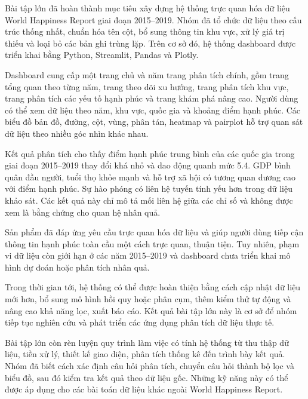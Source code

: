 
Bài tập lớn đã hoàn thành mục tiêu xây dựng hệ thống trực quan hóa dữ liệu World Happiness Report giai đoạn 2015--2019. Nhóm đã tổ chức dữ liệu theo cấu trúc thống nhất, chuẩn hóa tên cột, bổ sung thông tin khu vực, xử lý giá trị thiếu và loại bỏ các bản ghi trùng lặp. Trên cơ sở đó, hệ thống dashboard được triển khai bằng Python, Streamlit, Pandas và Plotly.

Dashboard cung cấp một trang chủ và năm trang phân tích chính, gồm trang tổng quan theo từng năm, trang theo dõi xu hướng, trang phân tích khu vực, trang phân tích các yếu tố hạnh phúc và trang khám phá nâng cao. Người dùng có thể xem dữ liệu theo năm, khu vực, quốc gia và khoảng điểm hạnh phúc. Các biểu đồ bản đồ, đường, cột, vùng, phân tán, heatmap và pairplot hỗ trợ quan sát dữ liệu theo nhiều góc nhìn khác nhau.

Kết quả phân tích cho thấy điểm hạnh phúc trung bình của các quốc gia trong giai đoạn 2015--2019 thay đổi khá nhỏ và dao động quanh mức 5.4. GDP bình quân đầu người, tuổi thọ khỏe mạnh và hỗ trợ xã hội có tương quan dương cao với điểm hạnh phúc. Sự hào phóng có liên hệ tuyến tính yếu hơn trong dữ liệu khảo sát. Các kết quả này chỉ mô tả mối liên hệ giữa các chỉ số và không được xem là bằng chứng cho quan hệ nhân quả.

Sản phẩm đã đáp ứng yêu cầu trực quan hóa dữ liệu và giúp người dùng tiếp cận thông tin hạnh phúc toàn cầu một cách trực quan, thuận tiện. Tuy nhiên, phạm vi dữ liệu còn giới hạn ở các năm 2015--2019 và dashboard chưa triển khai mô hình dự đoán hoặc phân tích nhân quả.

Trong thời gian tới, hệ thống có thể được hoàn thiện bằng cách cập nhật dữ liệu mới hơn, bổ sung mô hình hồi quy hoặc phân cụm, thêm kiểm thử tự động và nâng cao khả năng lọc, xuất báo cáo. Kết quả bài tập lớn này là cơ sở để nhóm tiếp tục nghiên cứu và phát triển các ứng dụng phân tích dữ liệu thực tế.

Bài tập lớn còn rèn luyện quy trình làm việc có tính hệ thống từ thu thập dữ liệu, tiền xử lý, thiết kế giao diện, phân tích thống kê đến trình bày kết quả. Nhóm đã biết cách xác định câu hỏi phân tích, chuyển câu hỏi thành bộ lọc và biểu đồ, sau đó kiểm tra kết quả theo dữ liệu gốc. Những kỹ năng này có thể được áp dụng cho các bài toán dữ liệu khác ngoài World Happiness Report.
